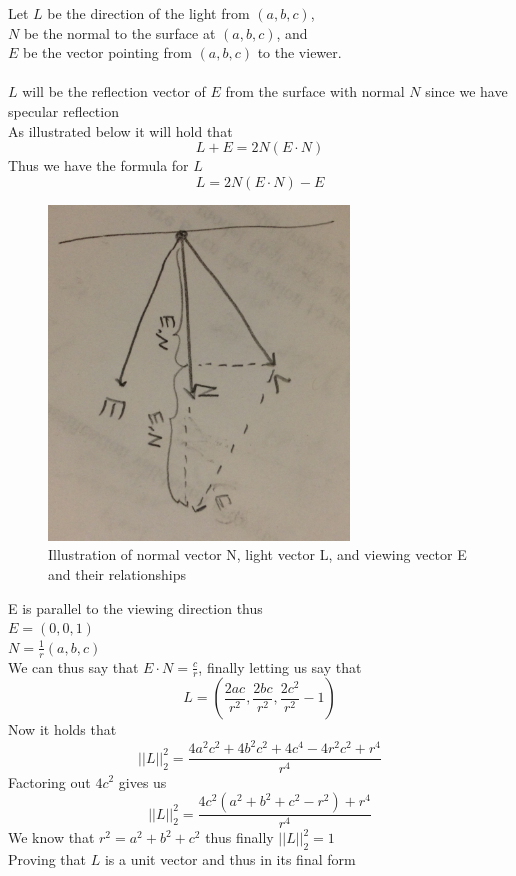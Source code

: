 \documentclass[11pt,psfig]{article}
\begin{document}
Let $L$ be the direction of the light from $(a,b,c)$, \\
$N$ be the normal to the surface at $(a,b,c)$, and \\
$E$ be the vector pointing from $(a,b,c)$ to the viewer. \\
\\
$L$ will be the reflection vector of $E$ from the surface with normal $N$ since we have specular reflection\\
As illustrated below it will hold that
\[
L + E = 2N(E \cdot N)
\]
Thus we have the formula for $L$
\[
L = 2N(E \cdot N) - E
\]
\begin{figure}[H]
\centering
\includegraphics[height=3.5in]{prob1diagram.jpg}
\caption{Illustration of normal vector N, light vector L, and viewing vector E and their relationships}
\end{figure}

\newpage

E is parallel to the viewing direction thus \\
$E=(0,0,1)$\\
$N = \frac{1}{r}(a,b,c)$\\
We can thus say that $E \cdot N = \frac{c}{r}$, finally letting us say that
\[
L = (\frac{2ac}{r^2},\frac{2bc}{r^2},\frac{2c^2}{r^2} - 1)
\]
Now it holds that
\[
||L||_2^2 = \frac{4a^2c^2 + 4b^2c^2 + 4c^4 - 4r^2c^2 + r^4}{r^4}
\]
Factoring out $4c^2$ gives us
\[
||L||_2^2 = \frac{4c^2(a^2 + b^2 + c^2 - r^2) + r^4}{r^4}
\]
We know that $r^2 = a^2 + b^2 + c^2$ thus finally $||L||_2^2 = 1$\\
Proving that $L$ is a unit vector and thus in its final form
\end{document}
